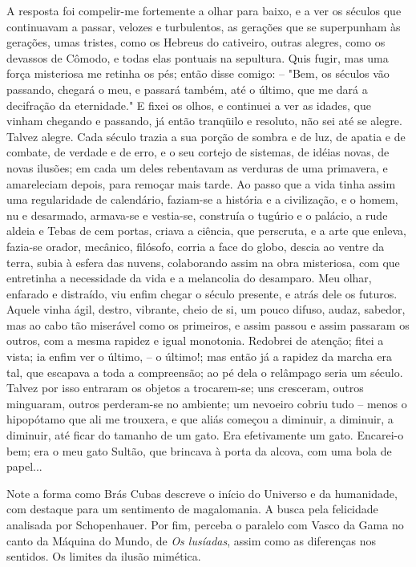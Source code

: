 \begin{corollary}
A resposta foi compelir-me fortemente a olhar para baixo, e a ver os séculos que continuavam a passar, velozes e turbulentos, as gerações que se superpunham às gerações, umas tristes, como os Hebreus do cativeiro, outras alegres, como os devassos de Cômodo, e todas elas pontuais na sepultura. Quis fugir, mas uma força misteriosa me retinha os pés; então disse comigo: -- "Bem, os séculos vão passando, chegará o meu, e passará também, até o último, que me dará a decifração da eternidade." E fixei os olhos, e continuei a ver as idades, que vinham chegando e passando, já então tranqüilo e resoluto, não sei até se alegre. Talvez alegre. Cada século trazia a sua porção de sombra e de luz, de apatia e de combate, de verdade e de erro, e o seu cortejo de sistemas, de idéias novas, de novas ilusões; em cada um deles rebentavam as verduras de uma primavera, e amareleciam depois, para remoçar mais tarde. Ao passo que a vida tinha assim uma regularidade de calendário, faziam-se a história e a civilização, e o homem, nu e desarmado, armava-se e vestia-se, construía o tugúrio e o palácio, a rude aldeia e Tebas de cem portas, criava a ciência, que perscruta, e a arte que enleva, fazia-se orador, mecânico, filósofo, corria a face do globo, descia ao ventre da terra, subia à esfera das nuvens, colaborando assim na obra misteriosa, com que entretinha a necessidade da vida e a melancolia do desamparo. Meu olhar, enfarado e distraído, viu enfim chegar o século presente, e atrás dele os futuros. Aquele vinha ágil, destro, vibrante, cheio de si, um pouco difuso, audaz, sabedor, mas ao cabo tão miserável como os primeiros, e assim passou e assim passaram os outros, com a mesma rapidez e igual monotonia. Redobrei de atenção; fitei a vista; ia enfim ver o último, -- o último!; mas então já a rapidez da marcha era tal, que escapava a toda a compreensão; ao pé dela o relâmpago seria um século. Talvez por isso entraram os objetos a trocarem-se; uns cresceram, outros minguaram, outros perderam-se no ambiente; um nevoeiro cobriu tudo -- menos o hipopótamo que ali me trouxera, e que aliás começou a diminuir, a diminuir, a diminuir, até ficar do tamanho de um gato. Era efetivamente um gato. Encarei-o bem; era o meu gato Sultão, que brincava à porta da alcova, com uma bola de papel...
\end{corollary}

Note a forma como Brás Cubas descreve o início do Universo e da humanidade, com destaque para um sentimento de magalomania. A busca pela felicidade analisada por Schopenhauer. Por fim, perceba o paralelo com Vasco da Gama no canto da Máquina do Mundo, de \textit{Os lusíadas}, assim como as diferenças nos sentidos. Os limites da ilusão mimética.

